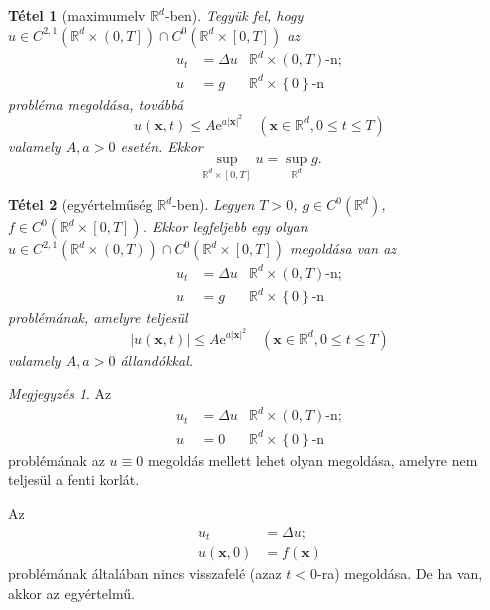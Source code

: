 \documentclass[%
	DIV=15,appendixprefix]{scrreprt}
\newtheorem*{tetel}{Tétel}
\theoremstyle{definition}
\theoremstyle{remark}
\newtheorem*{megj}{Megjegyzés}
\begin{document}
\begin{tetel}[maximumelv $ \mathbb{ R }^{ d } $-ben]
	Tegyük fel, hogy $ u \in C^{ 2,{} 1 } \left( \mathbb{ R }^{ d } \times \left.\left( 0,{} T \right]\right. \right) \cap C^{ 0 } \left( \mathbb{ R }^{ d } \times \left[ 0,{} T \right] \right) $ az
	\begin{align*}
		u_{ t } &= \Delta u & \mathbb{ R }^{ d } \times \left( 0,{} T \right) \text{-n};\\
		u &= g & \mathbb{ R }^{ d } \times \left\{ 0 \right\} \text{-n}
	\end{align*}
	probléma megoldása, továbbá
	\begin{equation*}
		u \left( \mathbf{ x },{} t \right) \le A \mathrm{ e }^{ a \left| \mathbf{ x }
		\right|^{ 2 } } \quad \left( \mathbf{ x } \in \mathbb{ R }^{ d },{} 0 \le t \le T \right)
	\end{equation*}
	valamely $ A,{} a > 0 $ esetén. Ekkor
	\begin{equation*}
		\sup_{ \mathbb{ R }^{ d } \times \left[ 0,{} T \right] } u = \sup_{ \mathbb{ R }^{ d } } g.
	\end{equation*}
\end{tetel}
\begin{tetel}[egyértelműség $\mathbb{R}^{d}$-ben]
Legyen $ T > 0$, $ g \in C^{ 0 } \left( \mathbb{ R }^{ d } \right) $, $ f \in C^{ 0 } \left(
\mathbb{ R }^{ d } \times \left[ 0,{} T \right] \right) $. Ekkor legfeljebb egy olyan $ u \in
C^{ 2,{} 1 } \left( \mathbb{ R }^{ d } \times \left( 0,{} T \right) \right) \cap C^{ 0 } \left(
\mathbb{ R }^{ d } \times \left[ 0,{} T \right] \right)$ megoldása van az
\begin{align*}
	u_{ t } &= \Delta u & \mathbb{ R }^{ d } \times \left( 0,{} T \right) \text{-n};\\
	u &= g & \mathbb{ R }^{ d } \times \left\{ 0 \right\} \text{-n}
\end{align*}
problémának, amelyre teljesül
\begin{equation*}
	\left| u \left( \mathbf{ x },{} t \right) \right| \le A \mathrm{ e }^{ a \left| \mathbf{ x } \right|^{ 2 } } \quad \left( \mathbf{ x } \in \mathbb{ R }^{ d },{} 0 \le t \le T \right)
\end{equation*}
valamely $ A,{} a > 0 $ állandókkal.
\end{tetel}
\begin{megj}
	Az
	\begin{align*}
		u_{ t } &= \Delta u & \mathbb{ R }^{ d } \times \left( 0,{} T \right) \text{-n};\\
		u &= 0 & \mathbb{ R }^{ d } \times \left\{ 0 \right\} \text{-n}
	\end{align*}
	problémának az $ u \equiv 0 $ megoldás mellett lehet olyan megoldása, amelyre nem teljesül a fenti korlát.
\end{megj}
Az
\begin{align*}
	u_{ t } &= \Delta u;\\
	u \left( \mathbf{ x },{} 0 \right) &= f \left( \mathbf{ x } \right)
\end{align*}
problémának általában nincs visszafelé (azaz $ t < 0 $-ra) megoldása. De ha van, akkor az
egyértelmű.
%
\end{document}
